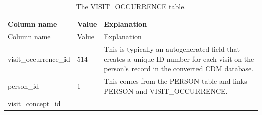 \documentclass[11pt]{book}
\begin{document}
\begin{longtable}[]{@{}lll@{}}
\caption{\label{tab:visitOccurrence} The VISIT\_OCCURRENCE
table.}\tabularnewline
\toprule
\begin{minipage}[b]{0.28\columnwidth}\raggedright\strut
Column name\strut
\end{minipage} & \begin{minipage}[b]{0.16\columnwidth}\raggedright\strut
Value\strut
\end{minipage} & \begin{minipage}[b]{0.48\columnwidth}\raggedright\strut
Explanation\strut
\end{minipage}\tabularnewline
\midrule
\endfirsthead
\toprule
\begin{minipage}[b]{0.28\columnwidth}\raggedright\strut
Column name\strut
\end{minipage} & \begin{minipage}[b]{0.16\columnwidth}\raggedright\strut
Value\strut
\end{minipage} & \begin{minipage}[b]{0.48\columnwidth}\raggedright\strut
Explanation\strut
\end{minipage}\tabularnewline
\midrule
\endhead
\begin{minipage}[t]{0.28\columnwidth}\raggedright\strut
visit\_occurrence\_id\strut
\end{minipage} & \begin{minipage}[t]{0.16\columnwidth}\raggedright\strut
514\strut
\end{minipage} & \begin{minipage}[t]{0.48\columnwidth}\raggedright\strut
This is typically an autogenerated field that creates a unique ID number
for each visit on the person's record in the converted CDM
database.\strut
\end{minipage}\tabularnewline
\begin{minipage}[t]{0.28\columnwidth}\raggedright\strut
person\_id\strut
\end{minipage} & \begin{minipage}[t]{0.16\columnwidth}\raggedright\strut
1\strut
\end{minipage} & \begin{minipage}[t]{0.48\columnwidth}\raggedright\strut
This comes from the PERSON table and links PERSON and
VISIT\_OCCURRENCE.\strut
\end{minipage}\tabularnewline
\begin{minipage}[t]{0.28\columnwidth}\raggedright\strut
visit\_concept\_id\strut

\end{minipage}
\end{longtable}
\end{document}
